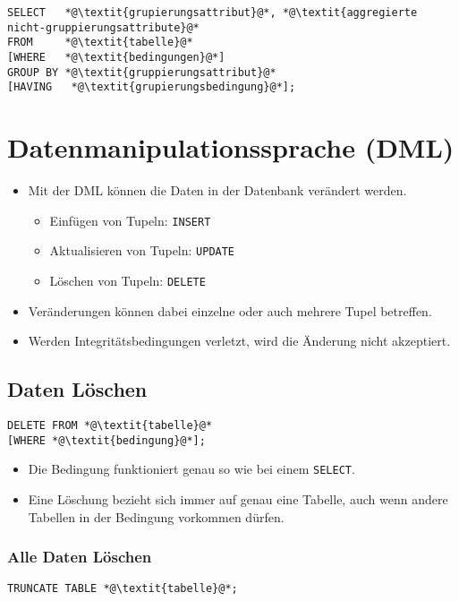 			\begin{lstlisting}
SELECT   *@\textit{grupierungsattribut}@*, *@\textit{aggregierte nicht-gruppierungsattribute}@*
FROM     *@\textit{tabelle}@*
[WHERE   *@\textit{bedingungen}@*]
GROUP BY *@\textit{gruppierungsattribut}@*
[HAVING   *@\textit{grupierungsbedingung}@*];
        	\end{lstlisting}

	\section{Datenmanipulationssprache (DML)} %
		\begin{itemize}
			\item Mit der DML können die Daten in der Datenbank verändert werden.
				\begin{itemize}
					\item Einfügen von Tupeln: \lstinline|INSERT|
					\item Aktualisieren von Tupeln: \lstinline|UPDATE|
					\item Löschen von Tupeln: \lstinline|DELETE|
				\end{itemize}
			\item Veränderungen können dabei einzelne oder auch mehrere Tupel betreffen.
			\item Werden Integritätsbedingungen verletzt, wird die Änderung nicht akzeptiert.
		\end{itemize}

		\subsection{Daten Löschen} %
			\begin{lstlisting}
DELETE FROM *@\textit{tabelle}@*
[WHERE *@\textit{bedingung}@*];
            \end{lstlisting}

			\begin{itemize}
				\item Die Bedingung funktioniert genau so wie bei einem \lstinline|SELECT|.
				\item Eine Löschung bezieht sich immer auf genau eine Tabelle, auch wenn andere Tabellen in der Bedingung vorkommen dürfen.
			\end{itemize}

			\subsubsection{Alle Daten Löschen} %
				\begin{lstlisting}
TRUNCATE TABLE *@\textit{tabelle}@*;
                \end{lstlisting}


